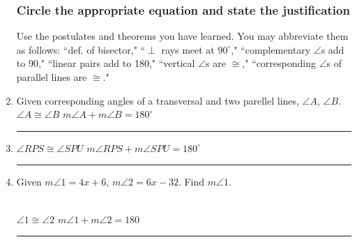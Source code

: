 \documentclass[12pt, oneside]{article}
\begin{document}
\begin{enumerate}
\newpage


\subsubsection*{Circle the appropriate equation and state the justification}
Use the postulates and theorems you have learned. You may abbreviate them as follows: ``def. of bisector," ``$\perp$ rays meet at $90^\circ$," ``complementary $\angle$s add to 90," ``linear pairs add to 180," ``vertical $\angle$s are $\cong$," ``corresponding $\angle$s of parallel lines are $\cong$."

\item Given corresponding angles of a transversal and two parellel lines, $\angle A$, $\angle B$.\\[0.5cm]
$\angle A \cong \angle B$ \hspace{1cm} $m \angle A + m \angle B=180^\circ$ \hspace{0.5cm} \rule{5cm}{0.15mm} \vspace{0.25cm}

\item $\angle RPS \cong \angle SPU$ \hspace{0.25cm} $m \angle RPS + m \angle SPU = 180^\circ$ \hspace{0.25cm} \rule{6cm}{0.15mm}  \vspace{0.25cm}

\item Given $m \angle 1 = 4x+6$, $m \angle 2 = 6x-32$. Find $m \angle 1$.
    \\[0.5cm]
    $\angle 1 \cong \angle 2$ \hspace{1cm} $m\angle 1 + m\angle 2 =  180$ \hspace{0.5cm} \rule{6cm}{0.15mm}


\end{enumerate}
\end{document}

